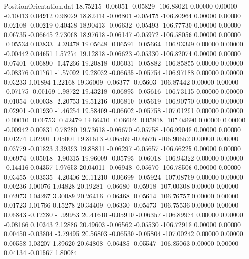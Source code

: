 \begin{filecontents}{PositionOrientation.dat}
  18.75215   -0.06051   -0.05829  -106.88021    0.00000    0.00000   -0.10413    0.04912    0.98029
  18.82414   -0.06801   -0.05475  -106.80964    0.00000    0.00000    0.02108   -0.00219    0.40438
  18.90413   -0.06632   -0.05493  -106.77730    0.00000    0.00000    0.06735   -0.06645    2.73068
  18.97618   -0.06147   -0.05972  -106.58056    0.00000    0.00000   -0.05534    0.03833   -4.39478
  19.05648   -0.06591   -0.05664  -106.93349    0.00000    0.00000   -0.00442    0.04651    1.57274
  19.12818   -0.06623   -0.05330  -106.82074    0.00000    0.00000    0.07401   -0.06890   -0.47266
  19.20818   -0.06031   -0.05882  -106.85855    0.00000    0.00000   -0.08376    0.01761   -1.57092
  19.28032   -0.06635   -0.05754  -106.97188    0.00000    0.00000    0.03233    0.01894    1.22168
  19.36009   -0.06377   -0.05603  -106.87442    0.00000    0.00000   -0.07175   -0.00169    1.98722
  19.43218   -0.06895   -0.05616  -106.73115    0.00000    0.00000    0.01054   -0.00038   -2.20753
  19.51216   -0.06810   -0.05619  -106.90770    0.00000    0.00000    0.02901   -0.01930   -1.46254
  19.58409   -0.06602   -0.05758  -107.01291    0.00000    0.00000   -0.00010   -0.00753   -0.42479
  19.66410   -0.06602   -0.05818  -107.04690    0.00000    0.00000   -0.00942    0.00831    0.78280
  19.73618   -0.06670   -0.05758  -106.99048    0.00000    0.00000    0.01274    0.02901    1.05001
  19.81613   -0.06569   -0.05526  -106.90652    0.00000    0.00000    0.03779   -0.01823    3.39393
  19.88811   -0.06297   -0.05657  -106.66225    0.00000    0.00000    0.06974   -0.05018   -3.90315
  19.96009   -0.05795   -0.06018  -106.94322    0.00000    0.00000   -0.14416    0.04357    1.97653
  20.04011   -0.06948   -0.05670  -106.78506    0.00000    0.00000    0.03455   -0.03535   -4.20406
  20.11210   -0.06699   -0.05924  -107.08769    0.00000    0.00000    0.00236    0.00076    1.04828
  20.19281   -0.06680   -0.05918  -107.00308    0.00000    0.00000    0.02973    0.04267    3.30089
  20.26416   -0.06468   -0.05614  -106.76757    0.00000    0.00000    0.01723    0.01766    0.15278
  20.34409   -0.06330   -0.05473  -106.75536    0.00000    0.00000    0.05843   -0.12280   -1.99953
  20.41610   -0.05910   -0.06357  -106.89934    0.00000    0.00000   -0.08166    0.10343    2.12886
  20.49603   -0.06562   -0.05530  -106.72918    0.00000    0.00000    0.00450   -0.03804   -3.79495
  20.56803   -0.06530   -0.05804  -107.00242    0.00000    0.00000    0.00558    0.03207    1.89620
  20.64808   -0.06485   -0.05547  -106.85063    0.00000    0.00000    0.04134   -0.01567    1.80084

\end{filecontents}
